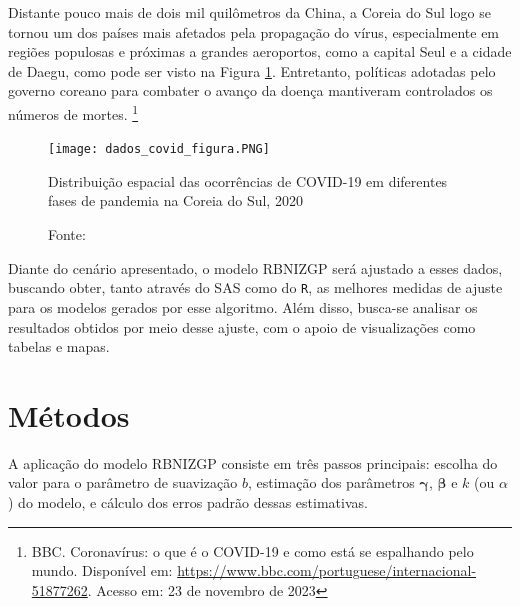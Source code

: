 \documentclass[12pt, a4paper, twoside]{report}
\numberwithin{equation}{section} %
\begin{document}
Distante pouco mais de dois mil quilômetros da China, a Coreia do Sul logo se tornou um dos países mais afetados pela propagação do vírus, especialmente em regiões populosas e próximas a grandes aeroportos, como a capital Seul e a cidade de Daegu, como pode ser visto na Figura \ref{fig:fig1}. Entretanto, políticas adotadas pelo governo coreano para combater o avanço da doença mantiveram controlados os números de mortes. \footnote{BBC. Coronavírus: o que é o COVID-19 e como está se espalhando pelo mundo. Disponível em: \url{https://www.bbc.com/portuguese/internacional-51877262}. Acesso em: 23 de novembro de 2023}

\begin{figure}[H]
    \centering
    \texttt{[image: dados\_covid\_figura.PNG]}
\caption{Distribuição espacial das ocorrências de COVID-19 em diferentes fases de pandemia na Coreia do Sul, 2020}
\caption*{\footnotesize Fonte: \cite{dasilva2023}}
\label{fig:fig1}
\end{figure}

Diante do cenário apresentado, o modelo RBNIZGP será ajustado a esses dados, buscando obter, tanto através do SAS como do \texttt{R}, as melhores medidas de ajuste para os modelos gerados por esse algoritmo. Além disso, busca-se analisar os resultados obtidos por meio desse ajuste, com o apoio de visualizações como tabelas e mapas.





\section{Métodos}\label{secao_4_2}

A aplicação do modelo RBNIZGP consiste em três passos principais: escolha do valor para o parâmetro de suavização $b$, estimação dos parâmetros $\boldsymbol{\gamma}$, $\boldsymbol{\beta}$ e $k$ (ou $\alpha$) do modelo, e cálculo dos erros padrão dessas estimativas.
\end{document}
